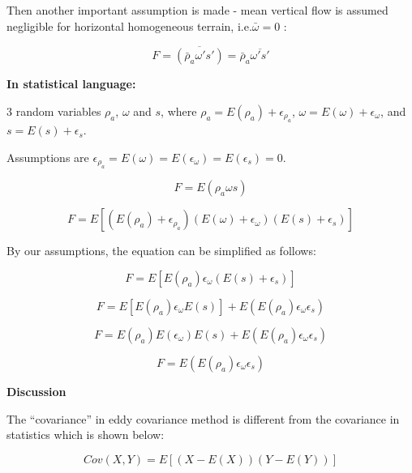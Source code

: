 \documentclass{article}
\begin{document}
\begin{appendices}
Then another important assumption is made - mean vertical flow is assumed negligible for horizontal homogeneous terrain, i.e.$\bar{\omega}=0$ :

\begin{equation}
F = \overline{(\bar{\rho}_a\omega's')} = \bar{\rho}_a\overline{\omega's'}
\end{equation}

\textbf{In statistical language:}

3 random variables $\rho_a$, $\omega$ and $s$, where $\rho_a = E(\rho_a) + \epsilon_{\rho_a}$, $\omega = E(\omega)+\epsilon_{\omega}$, and $s = E(s) +\epsilon_s$.

Assumptions are $\epsilon_{\rho_a} =E(\omega)=E(\epsilon_\omega)=E(\epsilon_s)= 0$.

\begin{equation}
F = E(\rho_a\omega s)
\end{equation}

\begin{equation}
F = E[(E(\rho_a) + \epsilon_{\rho_a})(E(\omega)+\epsilon_\omega)(E(s)+\epsilon_s)]
\end{equation}

By our assumptions, the equation can be simplified as follows:

\begin{equation}
F = E[E(\rho_a)\epsilon_\omega(E(s)+\epsilon_s)]
\end{equation}

\begin{equation}
F = E[E(\rho_a)\epsilon_\omega E(s)] + E(E(\rho_a)\epsilon_\omega\epsilon_s)
\end{equation}


\begin{equation}
F = E(\rho_a)E(\epsilon_\omega)E(s) + E(E(\rho_a)\epsilon_\omega\epsilon_s)
\end{equation}

\begin{equation}
F =  E(E(\rho_a)\epsilon_\omega\epsilon_s)
\end{equation}

\textbf{Discussion}

The ``covariance'' in eddy covariance method is different from the covariance in statistics which is shown below:

\begin{equation}
Cov(X,Y) = E[(X-E(X))(Y-E(Y))]
\end{equation}

\newpage


\end{appendices}
\end{document}

